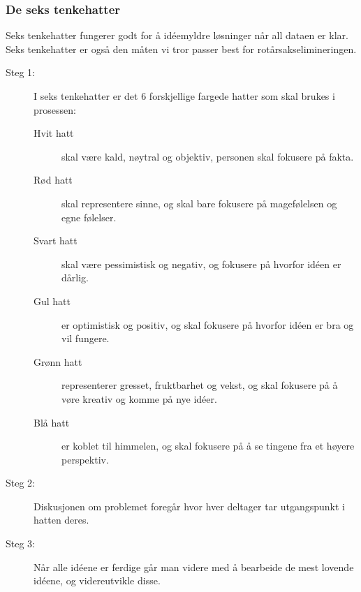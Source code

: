 \subsubsection{De seks tenkehatter} Seks tenkehatter fungerer godt for å idéemyldre løsninger når all dataen er klar. Seks tenkehatter er også den måten vi tror passer best for rotårsakselimineringen.
    \begin{description}
        \item[Steg 1:] I seks tenkehatter er det 6 forskjellige fargede hatter som skal brukes i prosessen:
            \begin{description}
                \item[Hvit hatt] skal være kald, nøytral og objektiv, personen skal fokusere på fakta.
                \item[Rød hatt] skal representere sinne, og skal bare fokusere på magefølelsen og egne følelser.
                \item[Svart hatt] skal være pessimistisk og negativ, og fokusere på hvorfor idéen er dårlig.
                \item[Gul hatt] er optimistisk og positiv, og skal fokusere på hvorfor idéen er bra og vil fungere.
                \item[Grønn hatt] representerer gresset, fruktbarhet og vekst, og skal fokusere på å vøre kreativ og komme på nye idéer.
                \item[Blå hatt] er koblet til himmelen, og skal fokusere på å se tingene fra et høyere perspektiv.
            \end{description}
        \item[Steg 2:] Diskusjonen om problemet foregår hvor hver deltager tar utgangspunkt i hatten deres.
        \item[Steg 3:] Når alle idéene er ferdige går man videre med å bearbeide de mest lovende idéene, og videreutvikle disse.
    \end{description}
    
